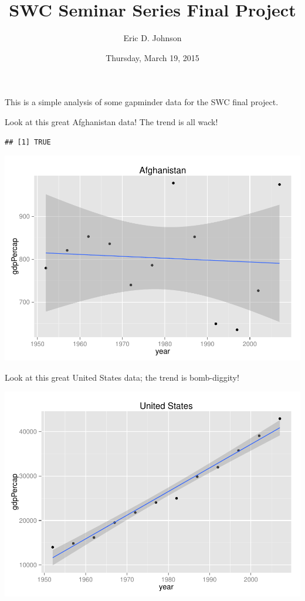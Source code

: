 \documentclass[]{article}
\title{SWC Seminar Series Final Project}
\author{Eric D. Johnson}
\date{Thursday, March 19, 2015}
\begin{document}
\maketitle


This is a simple analysis of some gapminder data for the SWC final
project.

Look at this great Afghanistan data! The trend is all wack!

\begin{verbatim}
## [1] TRUE
\end{verbatim}

\includegraphics{GapMinder_rMarkdown_files/figure-latex/unnamed-chunk-1.pdf}

Look at this great United States data; the trend is bomb-diggity!

\includegraphics{GapMinder_rMarkdown_files/figure-latex/unnamed-chunk-2.pdf}
\end{document}
